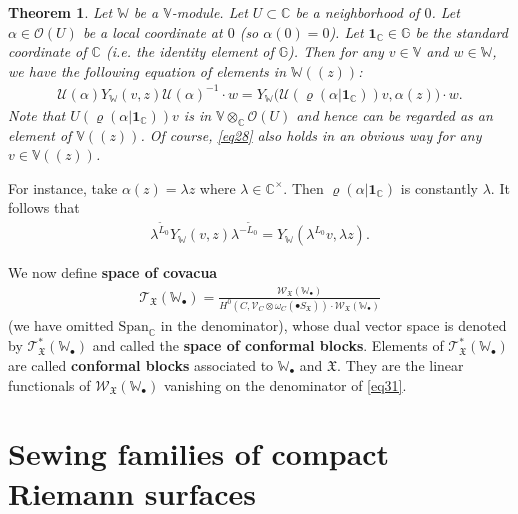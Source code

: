 \documentclass[12pt,a4paper,notitlepage]{article}
\theoremstyle{definition}
\theoremstyle{plain}
\newtheorem{thm}[df]{Theorem}
\newcommand{\fk}{\mathfrak}
\newcommand{\mc}{\mathcal}
\newcommand{\wtd}{\widetilde}
\newcommand{\id}{\mathbf{1}}
\newcommand{\Span}{\mathrm{Span}}
\newcommand{\scr}{\mathscr}
\newcommand{\blt}{\bullet}
\newcommand{\Vbb}{\mathbb V}
\newcommand{\Wbb}{\mathbb W}
\newcommand{\Gbb}{\mathbb G}
\newcommand{\Cbb}{\mathbb C}
\numberwithin{equation}{section}
\begin{document}
\begin{thm}\label{lb14}
	Let $\Wbb$ be a $\Vbb$-module. Let $U\subset\Cbb$ be a neighborhood of $0$. Let $\alpha\in\scr O(U)$ be a local coordinate at $0$ (so $\alpha(0)=0$). Let $\id_\Cbb\in\Gbb$ be the standard coordinate of $\Cbb$ (i.e.  the identity element of $\Gbb$). Then for any $v\in\Vbb$ and $w\in\Wbb$, we have the following equation of elements in $\Wbb((z))$:
	\begin{align}
	\mc U(\alpha)Y_\Wbb(v,z)\mc U(\alpha)^{-1}\cdot w=Y_{\Wbb}\big(\mc U(\varrho(\alpha|\id_\Cbb))v,\alpha(z)\big)\cdot w.\label{eq28}
	\end{align}
	Note that $U(\varrho(\alpha|\id_\Cbb))v$ is in $\Vbb\otimes_{\Cbb}\scr O(U)$ and hence can be regarded as an element of $\Vbb((z))$. Of course, \eqref{eq28} also holds in an obvious way for any $v\in\Vbb((z))$.
\end{thm}


For instance, take $\alpha(z)=\lambda z$ where $\lambda\in\Cbb^\times$. Then $\varrho(\alpha|\id_\Cbb)$ is constantly $\lambda$. It follows that
\begin{align}
\lambda^{\wtd L_0}Y_\Wbb(v,z)\lambda^{-\wtd L_0}=Y_\Wbb(\lambda^{L_0}v,\lambda z).\label{eq63}
\end{align}




We now define  \textbf{space of covacua} 
\begin{gather}
\scr T_{\fk X}(\Wbb_\blt)=\frac{\scr W_{\fk X}(\Wbb_\blt)}{H^0(C,\scr V_C\otimes\omega_C(\blt S_{\fk X}))\cdot \scr W_{\fk X}(\Wbb_\blt)}\label{eq31}
\end{gather}
(we have omitted $\Span_\Cbb$ in the denominator), whose dual vector space is denoted by $\scr T_{\fk X}^*(\Wbb_\blt)$ \index{T@$\scr T_{\fk X}^*(\Wbb_\blt),\scr T_{\fk X}^*(\Wbb_\blt)(\mc B)$} and called the \textbf{space of conformal blocks}.  Elements of $\scr T_{\fk X}^*(\Wbb_\blt)$ are called \textbf{conformal blocks} associated to $\Wbb_\blt$ and $\fk X$. They are the linear functionals of $\scr W_{\fk X}(\Wbb_\blt)$ vanishing on the denominator of \eqref{eq31}.














\section{Sewing families of compact Riemann surfaces}\label{lb6}
\end{document}
